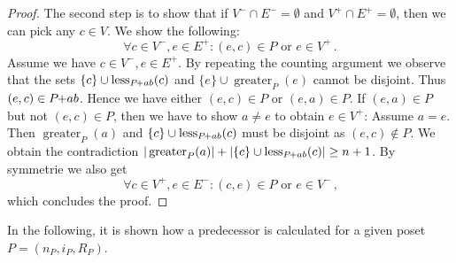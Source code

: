 \documentclass[twoside,leqno,twocolumn]{article}
\newcommand{\pchild}[3]{{#1}\kern-1pt{+}{#2}{#3}}
\newcommand{\less}[2]{\operatorname{less}_{#1}(#2)}
\newcommand{\greater}[2]{\operatorname{greater}_{#1}(#2)}
\begin{document}
\begin{proof}
  The second step is to show that if $V^- \cap E^- = \emptyset$ and $V^+ \cap E^+ = \emptyset$, then we can pick any $c \in V$.
  We show the following:
  \begin{equation}
    \forall c \in V^-, e \in E^+ \colon (e, c) \in P \text{ or } e \in V^+\,\text{.}
  \end{equation}
  Assume we have $c \in V^-, e \in E^+$.
  By repeating the counting argument we observe that the sets $\{c\} \cup \less{\pchild{P}{a}{b}}{c}$ and $\{e\} \cup \greater{P}{e}$ cannot be disjoint.
  Thus $(e, c) \in \pchild{P}{a}{b}$.
  Hence we have either $(e, c) \in P$ or $(e, a) \in P$.
  If $(e, a) \in P$ but not $(e, c) \in P$, then we have to show $a \neq e$ to obtain $e \in V^+$:
  Assume $a = e$.
  Then $\greater{P}{a}$ and $\{c\} \cup \less{\pchild{P}{a}{b}}{c}$ must be disjoint as $(e, c) \notin P$.
  We obtain the contradiction $|\greater{P}{a}| + |\{c\} \cup \less{\pchild{P}{a}{b}}{c}| \ge n + 1$.
  By symmetrie we also get
  \begin{equation}
    \forall c \in V^+, e \in E^- \colon (c, e) \in P \text{ or } e \in V^-\,\text{,}
  \end{equation}
  which concludes the proof.
\end{proof}

In the following, it is shown how a predecessor is calculated for a given poset $P = (n_P, i_P, R_P)$.
\end{document}
